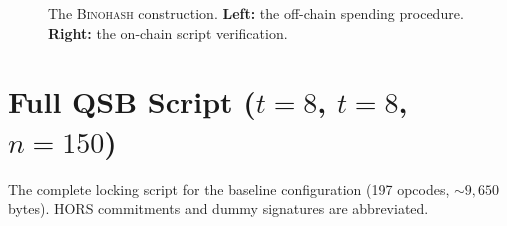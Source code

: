 \documentclass[11pt, a4paper]{article}
\begin{document}
\begin{figure}[ht]
\caption{The \textsc{Binohash} construction. \textbf{Left:} the off-chain spending procedure. \textbf{Right:} the on-chain script verification.}
\label{fig:binohash-scheme}
\end{figure}

\section{Full QSB Script ($t = 8$, $t = 8$, $n = 150$)}
\label{app:full-script}

The complete locking script for the baseline configuration (197 opcodes, ${\sim}9{,}650$ bytes). HORS commitments and dummy signatures are abbreviated.
\end{document}
